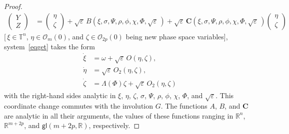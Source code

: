 \documentclass[12pt,reqno]{amsart}
\theoremstyle{definition}
\begin{document}
\begin{proof}
\begin{align*}
\begin{pmatrix} Y \\ Z \end{pmatrix} &=
\begin{pmatrix} \eta \\ \zeta \end{pmatrix} +
{{\sqrt{\varepsilon}}\,} B(\xi,\sigma,\Psi,\rho,\phi,\chi,\Phi,{{\sqrt{\varepsilon}}\,}) +
{{\sqrt{\varepsilon}}\,}{\mathbf C}(\xi,\sigma,\Psi,\rho,\phi,\chi,\Phi,{{\sqrt{\varepsilon}}\,})
\begin{pmatrix} \eta \\ \zeta \end{pmatrix}
\end{align*}
[\,$\xi\in{\mathbb T}^n$, $\eta\in{\mathcal O}_m(0)$, and $\zeta\in{\mathcal O}_{2p}(0)$ being new phase
space variables], system~\eqref{eqget} takes the form
\begin{equation}
\begin{aligned}
\dot{\xi} &= \omega+{{\sqrt{\varepsilon}}\,} O(\eta,\zeta), \\
\dot{\eta} &= {{\sqrt{\varepsilon}}\,} O_2(\eta,\zeta), \\
\dot{\zeta} &= \Lambda(\Phi)\zeta+{{\sqrt{\varepsilon}}\,} O_2(\eta,\zeta)
\end{aligned}
\label{eqgoal}
\end{equation}
with the right-hand sides analytic in $\xi$, $\eta$, $\zeta$, $\sigma$,
$\Psi$, $\rho$, $\phi$, $\chi$, $\Phi$, and ${\sqrt{\varepsilon}}$. This coordinate change
commutes with the involution $G$. The functions $A$, $B$, and ${\mathbf C}$ are
analytic in all their arguments, the values of these functions ranging in
${\mathbb R}^n$, ${\mathbb R}^{m+2p}$, and ${\mathsf{gl}}(m+2p,{\mathbb R})$, respectively.


\end{proof}
\end{document}
